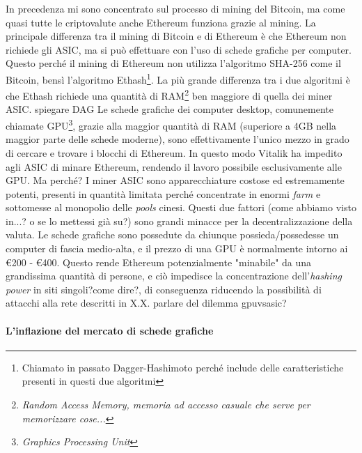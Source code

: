 \documentclass {article}
\begin{document}
In precedenza mi sono concentrato sul processo di mining del Bitcoin, ma come quasi tutte le criptovalute anche Ethereum funziona grazie al mining.
La principale differenza tra il mining di Bitcoin e di Ethereum è che Ethereum non richiede gli ASIC, ma si può effettuare con l'uso di schede grafiche per computer.
Questo perché il mining di Ethereum non utilizza l'algoritmo SHA-256 come il Bitcoin, bensì l'algoritmo Ethash\footnote{Chiamato in passato Dagger-Hashimoto perché include delle caratteristiche presenti in questi due algoritmi}.
La più grande differenza tra i due algoritmi è che Ethash richiede una quantità di RAM\footnote{\textit{Random Access Memory, memoria ad accesso casuale che serve per memorizzare cose...}} ben maggiore di quella dei miner ASIC. spiegare DAG
Le schede grafiche dei computer desktop, comunemente chiamate GPU\footnote{\textit{Graphics Processing Unit}}, grazie alla maggior quantità di RAM (superiore a 4GB nella maggior parte delle schede moderne), sono effettivamente l'unico mezzo in grado di cercare e trovare i blocchi di Ethereum.
In questo modo Vitalik ha impedito agli ASIC di minare Ethereum, rendendo il lavoro possibile esclusivamente alle GPU. Ma perché?
I miner ASIC sono apparecchiature costose ed estremamente potenti, presenti in quantità limitata perché concentrate in enormi \textit{farm} e sottomesse al monopolio delle \textit{pools} cinesi.
Questi due fattori (come abbiamo visto in...? o se lo mettessi già su?) sono grandi minacce per la decentralizzazione della valuta.
Le schede grafiche sono possedute da chiunque possieda/possedesse un computer di fascia medio-alta, e il prezzo di una GPU è normalmente intorno ai \euro{200} - \euro{400}.
Questo rende Ethereum potenzialmente "minabile" da una grandissima quantità di persone, e ciò impedisce la concentrazione dell'\textit{hashing power} in siti singoli?come dire?, di conseguenza riducendo la possibilità di attacchi alla rete descritti in X.X.
parlare del dilemma gpuvsasic?

\paragraph {L'inflazione del mercato di schede grafiche}
\end{document}
